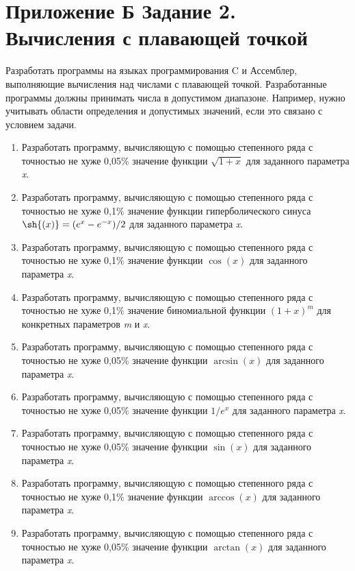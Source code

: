 \chapter*{Приложение Б Задание 2. Вычисления с плавающей точкой}

Разработать программы на языках программирования C и Ассемблер, выполняющие вычисления над числами с плавающей точкой. Разработанные программы должны принимать числа в допустимом диапазоне. Например, нужно учитывать области определения и допустимых значений, если это связано с условием задачи.

\begin{enumerate}
    \item Разработать программу, вычисляющую с помощью степенного ряда с точностью не хуже 0,05\% значение функции $\sqrt{1+x}$ для  заданного параметра \textit{x}.
    \item Разработать программу, вычисляющую с помощью степенного ряда с точностью не хуже 0,1\%  значение функции гиперболического синуса $\sh{(x)} = (e^x-e^{-x})/2$ для  заданного параметра \textit{x}.
    \item Разработать программу, вычисляющую с помощью степенного ряда с точностью не хуже 0,1\% значение функции $\cos{(x)}$ для  заданного параметра \textit{x}.
    \item Разработать программу, вычисляющую с помощью степенного ряда с точностью не хуже 0,1\% значение биномиальной функции $(1+x)^{m}$ для конкретных параметров \textit{m} и \textit{x}.
    \item Разработать программу, вычисляющую с помощью степенного ряда с точностью не хуже 0,05\%  значение функции $\arcsin{(x)}$ для  заданного параметра \textit{x}.
    \item Разработать программу, вычисляющую с помощью степенного ряда с точностью не хуже 0,05\%  значение функции $1/e^x$ для  заданного параметра \textit{x}.
    \item Разработать программу, вычисляющую с помощью степенного ряда с точностью не хуже 0,05\% значение функции $\sin{(x)}$ для  заданного параметра \textit{x}.
    \item Разработать программу, вычисляющую с помощью степенного ряда с точностью не хуже 0,1\% значение функции $\arccos(x)$ для  заданного параметра \textit{x}.
    \item Разработать программу, вычисляющую с помощью степенного ряда с точностью не хуже 0,05\% значение функции $\arctan{(x)}$ для  заданного параметра \textit{x}.

\end{enumerate}
